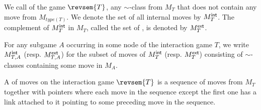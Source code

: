 We call  of the game $\revsem{T}$, any $\sim$-class from $M_T$ that does not contain any move from $M_{type(T)}$. We denote the set of all internal moves by $M_T^{\sf int}$. The complement of $M_T^{\sf int}$ in $M_T$, called the set of , is denoted by
$M_T^{\sf ext}$.

For any subgame $A$ occurring in some node of the interaction game $T$, we write $M_{T,A}^{\sf int}$ (resp. $M_{T,A}^{\sf ext}$) for the subset of moves of $M_T^{\sf int}$ (resp. $M_T^{\sf ext}$) consisting of $\sim$-classes containing some move in $M_A$.
\smallskip

A  of moves on the interaction game $\revsem{T}$ is a sequence of moves from $M_T$ together with pointers where each move in the sequence except the first one has a link attached to it pointing to some preceding move in the sequence.


